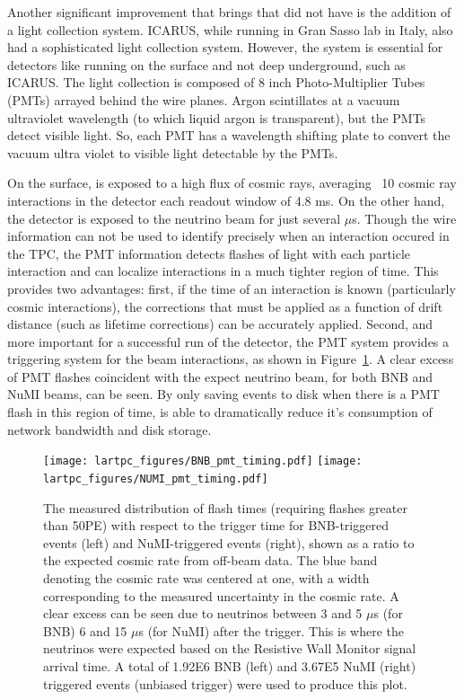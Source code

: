 Another significant improvement that \uboone brings that \argoneut did not have is the addition of a light collection system.  ICARUS, while running in Gran Sasso lab in Italy, also had a sophisticated light collection system.  However, the system is essential for detectors like \uboone running on the surface and not deep underground, such as ICARUS.  The \uboone light collection is composed of 8 inch Photo-Multiplier Tubes (PMTs) arrayed behind the wire planes.  Argon scintillates at a vacuum ultraviolet wavelength (to which liquid argon is transparent), but the PMTs detect visible light.  So, each PMT has a wavelength shifting plate to convert the vacuum ultra violet to visible light detectable by the PMTs.

On the surface, \uboone is exposed to a high flux of cosmic rays, averaging ~10 cosmic ray interactions in the detector each readout window of 4.8 ms.  On the other hand, the detector is exposed to the neutrino beam for just several $\mu$s.  Though the wire information can not be used to identify precisely when an interaction occured in the TPC, the PMT information detects flashes of light with each particle interaction and can localize interactions in a much tighter region of time.  This provides two advantages: first, if the time of an interaction is known (particularly cosmic interactions), the corrections that must be applied as a function of drift distance (such as lifetime corrections) can be accurately applied.  Second, and more important for a successful run of the detector, the PMT system provides a triggering system for the beam interactions, as shown in Figure~\ref{fig:pmt_timing}.  A clear excess of PMT flashes coincident with the expect neutrino beam, for both BNB and NuMI beams, can be seen.  By only saving events to disk when there is a PMT flash in this region of time, \uboone is able to dramatically reduce it's consumption of network bandwidth and disk storage.

\begin{figure}[htb]
  \centering
  \texttt{[image: lartpc\_figures/BNB\_pmt\_timing.pdf]}
  \texttt{[image: lartpc\_figures/NUMI\_pmt\_timing.pdf]}
  \caption[\uboone O2 Contamination]{The measured distribution of flash times (requiring flashes greater than 50PE) with respect to the trigger time for BNB-triggered events (left) and NuMI-triggered events (right), shown as a ratio to the expected cosmic rate from off-beam data. The blue band denoting the cosmic rate was centered at one, with a width corresponding to the measured uncertainty in the cosmic rate. A clear excess can be seen due to neutrinos between 3 and 5 $\mu$s (for BNB) 6 and 15 $\mu$s (for NuMI) after the trigger. This is where the neutrinos were expected based on the Resistive Wall Monitor signal arrival time. A total of 1.92E6 BNB (left) and 3.67E5 NuMI (right) triggered events (unbiased trigger) were used to produce this plot. \cite{uboone_pub_1010}}
  \label{fig:pmt_timing}
\end{figure}

